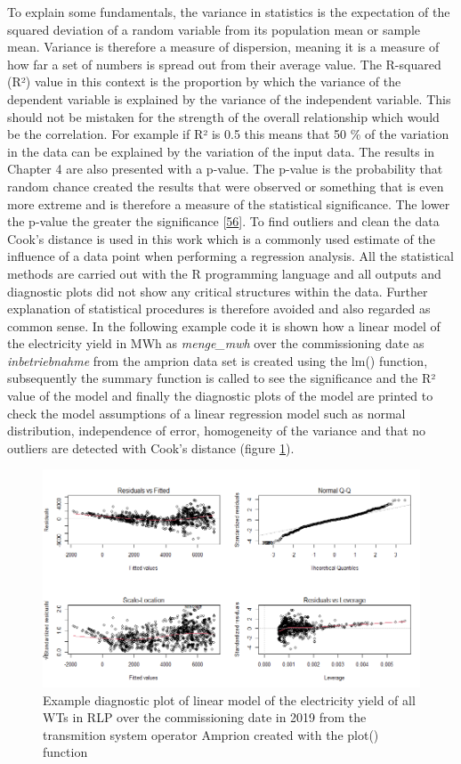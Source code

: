 \documentclass[a4paper,11pt]{article}
\begin{document}
To explain some fundamentals, the variance in statistics is the expectation of the squared deviation of a random variable from its population mean or sample mean. Variance is therefore a measure of dispersion, meaning it is a measure of how far a set of numbers is spread out from their average value. The R-squared (R²) value in this context is the proportion by which the variance of the dependent variable is explained by the variance of the independent variable. This should not be mistaken for the strength of the overall relationship which would be the correlation. For example if R² is 0.5 this means that 50 \% of the variation in the data can be explained by the variation of the input data. The results in Chapter 4 are also presented with a p-value. The p-value is the probability that random chance created the results that were observed or something that is even more extreme and is therefore a measure of the statistical significance. The lower the p-value the greater the significance {[}\protect\hyperlink{ref-LeoH.Kahane.2006}{56}{]}. To find outliers and clean the data Cook's distance is used in this work which is a commonly used estimate of the influence of a data point when performing a regression analysis. All the statistical methods are carried out with the R programming language and all outputs and diagnostic plots did not show any critical structures within the data. Further explanation of statistical procedures is therefore avoided and also regarded as common sense. In the following example code it is shown how a linear model of the electricity yield in MWh as \emph{menge\_mwh} over the commissioning date as \emph{inbetriebnahme} from the amprion data set is created using the lm() function, subsequently the summary function is called to see the significance and the R² value of the model and finally the diagnostic plots of the model are printed to check the model assumptions of a linear regression model such as normal distribution, independence of error, homogeneity of the variance and that no outliers are detected with Cook's distance (figure \ref{fig:diagnostics}).
\begin{figure}[H]

{\centering \includegraphics[width=1\linewidth]{figures/diagnostics} 

}

\caption{Example diagnostic plot of linear model of the electricity yield of all WTs in RLP over the commissioning date in 2019 from the transmition system operator Amprion created with the plot() function}\label{fig:diagnostics}
\end{figure}
\end{document}
